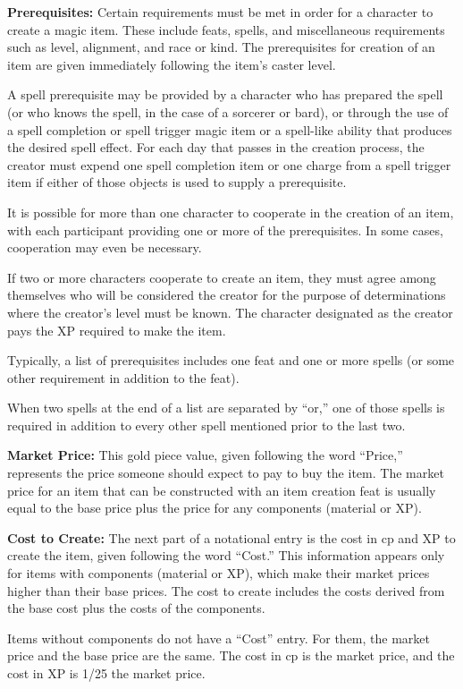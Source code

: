 \textbf{Prerequisites:} Certain requirements must be met in order for a character to create a magic item. These include feats, spells, and miscellaneous requirements such as level, alignment, and race or kind. The prerequisites for creation of an item are given immediately following the item's caster level.

A spell prerequisite may be provided by a character who has prepared the spell (or who knows the spell, in the case of a sorcerer or bard), or through the use of a spell completion or spell trigger magic item or a spell-like ability that produces the desired spell effect. For each day that passes in the creation process, the creator must expend one spell completion item or one charge from a spell trigger item if either of those objects is used to supply a prerequisite.

It is possible for more than one character to cooperate in the creation of an item, with each participant providing one or more of the prerequisites. In some cases, cooperation may even be necessary.

If two or more characters cooperate to create an item, they must agree among themselves who will be considered the creator for the purpose of determinations where the creator's level must be known. The character designated as the creator pays the XP required to make the item.

Typically, a list of prerequisites includes one feat and one or more spells (or some other requirement in addition to the feat).

When two spells at the end of a list are separated by ``or,'' one of those spells is required in addition to every other spell mentioned prior to the last two.

\textbf{Market Price:} This gold piece value, given following the word ``Price,'' represents the price someone should expect to pay to buy the item. The market price for an item that can be constructed with an item creation feat is usually equal to the base price plus the price for any components (material or XP).

\textbf{Cost to Create:} The next part of a notational entry is the cost in cp and XP to create the item, given following the word ``Cost.'' This information appears only for items with components (material or XP), which make their market prices higher than their base prices. The cost to create includes the costs derived from the base cost plus the costs of the components.

Items without components do not have a ``Cost'' entry. For them, the market price and the base price are the same. The cost in cp is \onehalf the market price, and the cost in XP is 1/25 the market price.

